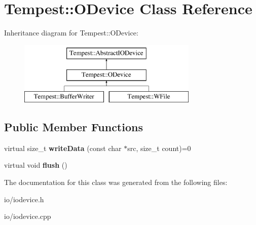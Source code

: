 \hypertarget{class_tempest_1_1_o_device}{\section{Tempest\+:\+:O\+Device Class Reference}
\label{class_tempest_1_1_o_device}
}
Inheritance diagram for Tempest\+:\+:O\+Device\+:\begin{figure}[H]
\begin{center}
\leavevmode
\includegraphics[height=3.000000cm]{class_tempest_1_1_o_device}
\end{center}
\end{figure}
\subsection*{Public Member Functions}
\begin{DoxyCompactItemize}
\item 
\hypertarget{class_tempest_1_1_o_device_a6f6971a9028adaf99df03843384de797}{virtual size\+\_\+t {\bfseries write\+Data} (const char $\ast$src, size\+\_\+t count)=0}\label{class_tempest_1_1_o_device_a6f6971a9028adaf99df03843384de797}

\item 
\hypertarget{class_tempest_1_1_o_device_aee7a02b15a9173101bdcbdda6d08296a}{virtual void {\bfseries flush} ()}\label{class_tempest_1_1_o_device_aee7a02b15a9173101bdcbdda6d08296a}

\end{DoxyCompactItemize}


The documentation for this class was generated from the following files\+:\begin{DoxyCompactItemize}
\item 
io/iodevice.\+h\item 
io/iodevice.\+cpp\end{DoxyCompactItemize}
